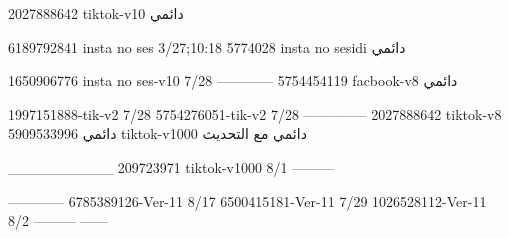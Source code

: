 2027888642 tiktok-v10
دائمي

6189792841 insta no ses
3/27;10:18
5774028 insta no sesidi
دائمي

1650906776 insta no ses-v10
7/28
------------
5754454119 facbook-v8
دائمي

1997151888-tik-v2
7/28
5754276051-tik-v2
7/28
--------------
2027888642 tiktok-v8
دائمي
5909533996 tiktok-v1000
دائمي مع التحديث

__________
209723971 tiktok-v1000
8/1
---------

------------
6785389126-Ver-11
8/17
6500415181-Ver-11
7/29
1026528112-Ver-11
8/2
---------
------
